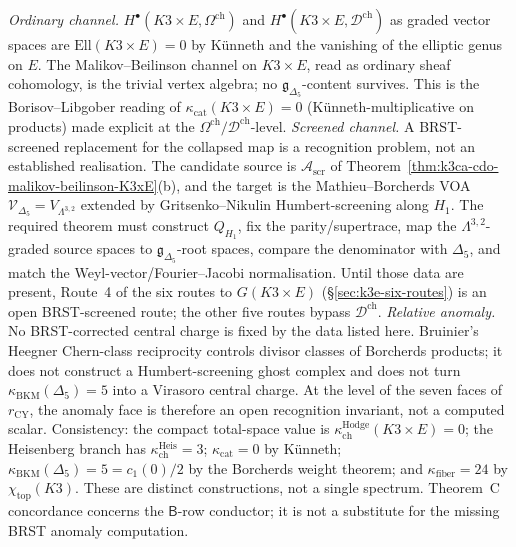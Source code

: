 \begin{remark}
\label{rmk:k3ca-cdo-killed-surviving-hidden}
\emph{Ordinary channel.} $H^\bullet(K3\times E,\Omega^{\mathrm{ch}})$ and $H^\bullet(K3\times E,\mathcal D^{\mathrm{ch}})$ as graded vector spaces are $\mathrm{Ell}(K3\times E)=0$ by K\"unneth and the vanishing of the elliptic genus on $E$. The Malikov--Beilinson channel on $K3\times E$, read as ordinary sheaf cohomology, is the trivial vertex algebra; no $\mathfrak g_{\Delta_5}$-content survives. This is the Borisov--Libgober reading of $\kappa_{\mathrm{cat}}(K3\times E)=0$ (Künneth-multiplicative on products) made explicit at the $\Omega^{\mathrm{ch}}/\mathcal D^{\mathrm{ch}}$-level.
\emph{Screened channel.} A BRST-screened replacement for the collapsed map is a recognition problem, not an established realisation. The candidate source is \(\mathcal A_{\mathrm{scr}}\) of Theorem~\ref{thm:k3ca-cdo-malikov-beilinson-K3xE}(b), and the target is the Mathieu--Borcherds VOA \(\mathcal V_{\Delta_5}=V_{\Lambda^{3,2}}\) extended by Gritsenko--Nikulin Humbert-screening along \(H_1\). The required theorem must construct \(Q_{H_1}\), fix the parity/supertrace, map the \(\Lambda^{3,2}\)-graded source spaces to \(\mathfrak g_{\Delta_5}\)-root spaces, compare the denominator with \(\Delta_5\), and match the Weyl-vector/Fourier--Jacobi normalisation. Until those data are present, Route~4 of the six routes to \(G(K3\times E)\) (\S\ref{sec:k3e-six-routes}) is an open BRST-screened route; the other five routes bypass \(\mathcal D^{\mathrm{ch}}\).
\emph{Relative anomaly.} No BRST-corrected central charge is fixed by
the data listed here. Bruinier's Heegner Chern-class reciprocity controls
divisor classes of Borcherds products; it does not construct a
Humbert-screening ghost complex and does not turn
\(\kappa_{\mathrm{BKM}}(\Delta_5)=5\) into a Virasoro central charge.
At the level of the seven faces of \(r_{\mathrm{CY}}\), the anomaly face
is therefore an open recognition invariant, not a computed scalar.
Consistency: the compact total-space value is $\kappa_{\mathrm{ch}}^{\mathrm{Hodge}}(K3\times E)=0$; the Heisenberg branch has $\kappa_{\mathrm{ch}}^{\mathrm{Heis}}=3$; $\kappa_{\mathrm{cat}}=0$ by K\"unneth; $\kappa_{\mathrm{BKM}}(\Delta_5)=5=c_1(0)/2$ by the Borcherds weight theorem; and $\kappa_{\mathrm{fiber}}=24$ by $\chi_{\mathrm{top}}(K3)$.
These are distinct constructions, not a single spectrum.
Theorem~C concordance concerns the $\mathsf{B}$-row conductor; it is not
a substitute for the missing BRST anomaly computation.

\end{remark}
